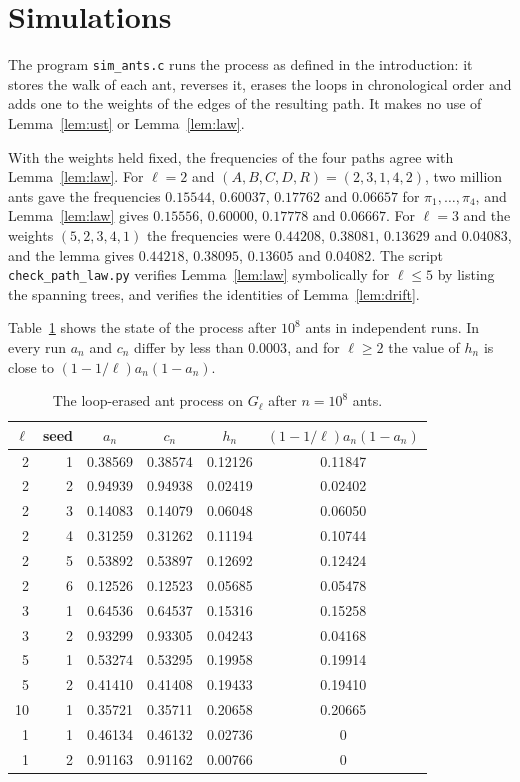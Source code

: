\documentclass[11pt]{amsart}
\theoremstyle{remark}
\begin{document}
\section{Simulations}

The program \texttt{sim\_ants.c} runs the process as defined in the introduction: it stores the walk of each ant,
reverses it, erases the loops in chronological order and adds one to the weights of the edges of the resulting path.
It makes no use of Lemma~\ref{lem:ust} or Lemma~\ref{lem:law}.

With the weights held fixed, the frequencies of the four paths agree with Lemma~\ref{lem:law}. For $\ell=2$ and
$(A,B,C,D,R)=(2,3,1,4,2)$, two million ants gave the frequencies $0.15544$, $0.60037$, $0.17762$ and $0.06657$ for
$\pi_1,\dots,\pi_4$, and Lemma~\ref{lem:law} gives $0.15556$, $0.60000$, $0.17778$ and $0.06667$. For $\ell=3$ and
the weights $(5,2,3,4,1)$ the frequencies were $0.44208$, $0.38081$, $0.13629$ and $0.04083$, and the lemma gives
$0.44218$, $0.38095$, $0.13605$ and $0.04082$. The script
\texttt{check\_path\_law.py} verifies Lemma~\ref{lem:law} symbolically for $\ell\le5$ by listing the spanning trees,
and verifies the identities of Lemma~\ref{lem:drift}.

Table~\ref{tab:runs} shows the state of the process after $10^8$ ants in independent runs. In every run $a_n$ and
$c_n$ differ by less than $0.0003$, and for $\ell\ge2$ the value of $h_n$ is close to $(1-1/\ell)a_n(1-a_n)$.

\begin{table}[ht]
\centering
\begin{tabular}{rrcccc}
\toprule
$\ell$ & seed & $a_n$ & $c_n$ & $h_n$ & $(1-1/\ell)a_n(1-a_n)$\\
\midrule
2 & 1 & 0.38569 & 0.38574 & 0.12126 & 0.11847\\
2 & 2 & 0.94939 & 0.94938 & 0.02419 & 0.02402\\
2 & 3 & 0.14083 & 0.14079 & 0.06048 & 0.06050\\
2 & 4 & 0.31259 & 0.31262 & 0.11194 & 0.10744\\
2 & 5 & 0.53892 & 0.53897 & 0.12692 & 0.12424\\
2 & 6 & 0.12526 & 0.12523 & 0.05685 & 0.05478\\
3 & 1 & 0.64536 & 0.64537 & 0.15316 & 0.15258\\
3 & 2 & 0.93299 & 0.93305 & 0.04243 & 0.04168\\
5 & 1 & 0.53274 & 0.53295 & 0.19958 & 0.19914\\
5 & 2 & 0.41410 & 0.41408 & 0.19433 & 0.19410\\
10 & 1 & 0.35721 & 0.35711 & 0.20658 & 0.20665\\
1 & 1 & 0.46134 & 0.46132 & 0.02736 & 0\\
1 & 2 & 0.91163 & 0.91162 & 0.00766 & 0\\
\bottomrule
\end{tabular}
\caption{The loop-erased ant process on $G_\ell$ after $n=10^8$ ants.}\label{tab:runs}
\end{table}
\end{document}
